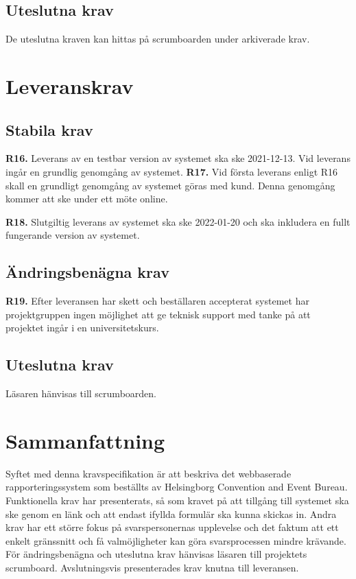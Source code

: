 \documentclass{article}
\begin{document}
    \vspace{1em}    
    \subsection{Uteslutna krav}
    De uteslutna kraven kan hittas på scrumboarden under arkiverade krav.
    \newpage
    \section{Leveranskrav}
    
    \subsection{Stabila krav}
\noindent \large{\textbf{R16.}}
     \normalsize{Leverans av en testbar version av systemet ska ske 2021-12-13. Vid leverans ingår en grundlig genomgång av systemet.
     }
\noindent \large{\textbf{R17.}}
     \normalsize{Vid första leverans enligt R16 skall en grundligt genomgång av systemet göras med kund. Denna genomgång kommer att ske under ett möte online.}
     
     \vspace{1em}
     

     
\noindent \large{\textbf{R18.}}
    \normalsize{Slutgiltig leverans av systemet ska ske 2022-01-20 och ska inkludera en fullt fungerande version av systemet.}
    
     
    \subsection{Ändringsbenägna krav}
    
    \noindent \large{\textbf{R19.}}
    \normalsize{Efter leveransen har skett och beställaren accepterat systemet har projektgruppen ingen möjlighet att ge teknisk support med tanke på att projektet ingår i en universitetskurs.}
    
    \subsection{Uteslutna krav}
    Läsaren hänvisas till scrumboarden.
    

\section{Sammanfattning}
Syftet med denna kravspecifikation är att beskriva det webbaserade rapporteringssystem som beställts av Helsingborg Convention and Event Bureau. Funktionella krav har presenterats, så som kravet på att tillgång till systemet ska ske genom en länk och att endast ifyllda formulär ska kunna skickas in. Andra krav har ett större fokus på svarspersonernas upplevelse och det faktum att ett enkelt gränssnitt och få valmöjligheter kan göra svarsprocessen mindre krävande. För ändringsbenägna och uteslutna krav hänvisas läsaren till projektets scrumboard. Avslutningsvis presenterades krav knutna till leveransen. 
    
    
   

\end{document}
